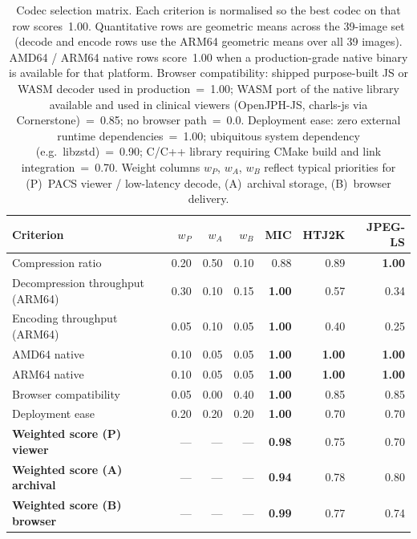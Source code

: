 \documentclass[journal]{IEEEtran}
\begin{document}
\begin{table}[t]
\centering
\caption{Codec selection matrix. Each criterion is normalised so the
best codec on that row scores~1.00. Quantitative rows are geometric
means across the 39-image set (decode and encode rows use the ARM64
geometric means over all 39 images). AMD64 / ARM64 native rows score~1.00
when a production-grade native binary is available for that platform.
Browser compatibility: shipped purpose-built JS or WASM decoder used in
production~=~1.00; WASM port of the native library available and used in
clinical viewers (OpenJPH-JS, charls-js via Cornerstone)~=~0.85;
no browser path~=~0.0. Deployment ease: zero external runtime
dependencies~=~1.00; ubiquitous system dependency (e.g.\ libzstd)~=~0.90;
C/C++ library requiring CMake build and link integration~=~0.70.
Weight columns $w_P$, $w_A$, $w_B$ reflect typical priorities for
(P)~PACS viewer / low-latency decode, (A)~archival storage,
(B)~browser delivery.}
\label{tab:decision-matrix}
\scriptsize
\setlength{\tabcolsep}{3pt}
\begin{tabular}{lrrrrrr}
\toprule
Criterion & $w_P$ & $w_A$ & $w_B$ & MIC & HTJ2K & JPEG-LS \\
\midrule
Compression ratio                & 0.20 & 0.50 & 0.10 & 0.88 & 0.89 & \textbf{1.00} \\
Decompression throughput (ARM64) & 0.30 & 0.10 & 0.15 & \textbf{1.00} & 0.57 & 0.34 \\
Encoding throughput (ARM64)      & 0.05 & 0.10 & 0.05 & \textbf{1.00} & 0.40 & 0.25 \\
AMD64 native                     & 0.10 & 0.05 & 0.05 & \textbf{1.00} & \textbf{1.00} & \textbf{1.00} \\
ARM64 native                     & 0.10 & 0.05 & 0.05 & \textbf{1.00} & \textbf{1.00} & \textbf{1.00} \\
Browser compatibility            & 0.05 & 0.00 & 0.40 & \textbf{1.00} & 0.85 & 0.85 \\
Deployment ease                  & 0.20 & 0.20 & 0.20 & \textbf{1.00} & 0.70 & 0.70 \\
\midrule
\textbf{Weighted score (P) viewer}   & --- & --- & --- & \textbf{0.98} & 0.75 & 0.70 \\
\textbf{Weighted score (A) archival} & --- & --- & --- & \textbf{0.94} & 0.78 & 0.80 \\
\textbf{Weighted score (B) browser}  & --- & --- & --- & \textbf{0.99} & 0.77 & 0.74 \\
\bottomrule
\end{tabular}
\end{table}
\end{document}
